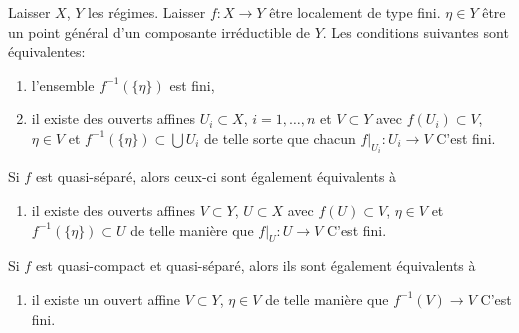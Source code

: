 \begin{lemma}

\label{lemma-generically-finite}

Laisser $X$, $Y$ les régimes. Laisser $f : X \to Y$ être localement de type fini. $\eta \in Y$ être un point général d'un composante irréductible de $Y$. Les conditions suivantes sont équivalentes:

\begin{enumerate}

\item l'ensemble $f^{-1}(\{\eta\})$ est fini,
\item il existe des ouverts affines $U_i \subset X$, $i = 1, \ldots, n$
et $V \subset Y$ avec $f(U_i) \subset V$,
$\eta \in V$ et $f^{-1}(\{\eta\}) \subset \bigcup U_i$
de telle sorte que chacun $f|_{U_i} : U_i \to V$ C'est fini.

\end{enumerate}

Si $f$ est quasi-séparé, alors ceux-ci sont également équivalents à

\begin{enumerate}

\item[(3)] il existe des ouverts affines $V \subset Y$, $U \subset X$ avec $f(U) \subset V$,
$\eta \in V$ et $f^{-1}(\{\eta\}) \subset U$
de telle manière que $f|_U : U \to V$ C'est fini.

\end{enumerate}

Si $f$ est quasi-compact et quasi-séparé, alors ils sont également équivalents à

\begin{enumerate}

\item[(4)] il existe un ouvert affine $V \subset Y$, $\eta \in V$
de telle manière que $f^{-1}(V) \to V$ C'est fini.

\end{enumerate}

\end{lemma}

